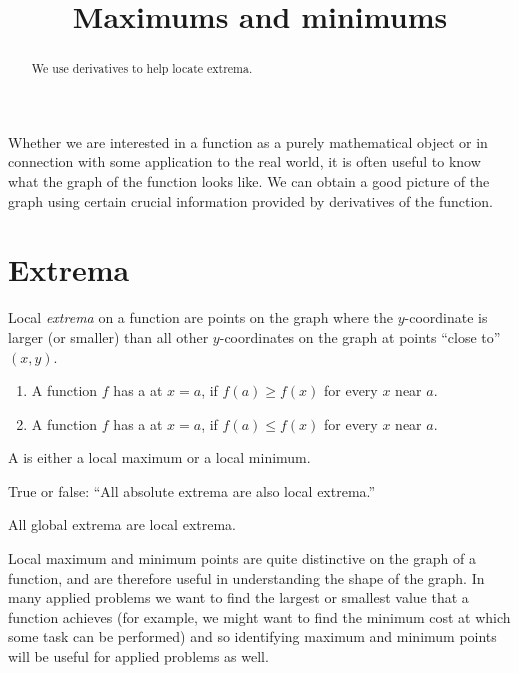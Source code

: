 \documentclass{ximera}
\title[Dig-In]{Maximums and minimums}
\begin{document}
\begin{abstract}
We use derivatives to help locate extrema.  
\end{abstract}
\maketitle


Whether we are interested in a function as a purely mathematical
object or in connection with some application to the real world, it is
often useful to know what the graph of the function looks like. We can
obtain a good picture of the graph using certain crucial information
provided by derivatives of the function.

\section{Extrema}

Local \textit{extrema} on a function are points on the graph where the
$y$-coordinate is larger (or smaller) than all other $y$-coordinates
on the graph at points ``close to'' $(x,y)$. 

\begin{definition}\hfil{}
\begin{enumerate}
\item A function $f$ has a  at $x=a$, if $f(a)\ge
  f(x)$ for every $x$ near $a$.
\item A function $f$ has a  at $x=a$, if $f(a)\le
  f(x)$ for every $x$ near $a$.
\end{enumerate}
A  is either a local
maximum or a local minimum.
\end{definition}

\begin{question}
  True or false: ``All absolute extrema are also local extrema.''
  \begin{multipleChoice}
  \end{multipleChoice}
  \begin{feedback}
    All global extrema are local extrema.
  \end{feedback}
\end{question}

Local maximum and minimum points are quite distinctive on the graph of
a function, and are therefore useful in understanding the shape of the
graph. In many applied problems we want to find the largest or
smallest value that a function achieves (for example, we might want
to find the minimum cost at which some task can be performed) and so
identifying maximum and minimum points will be useful for applied
problems as well.
\end{document}
